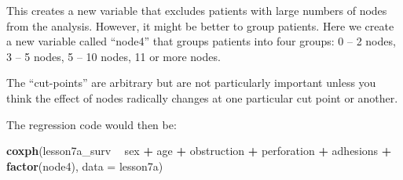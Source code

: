 \documentclass[]{book}
\newenvironment{Shaded}{\begin{snugshade}}{\end{snugshade}}
\newcommand{\DataTypeTok}[1]{\textcolor[rgb]{0.13,0.29,0.53}{#1}}
\newcommand{\DecValTok}[1]{\textcolor[rgb]{0.00,0.00,0.81}{#1}}
\newcommand{\KeywordTok}[1]{\textcolor[rgb]{0.13,0.29,0.53}{\textbf{#1}}}
\newcommand{\NormalTok}[1]{#1}
\newcommand{\OperatorTok}[1]{\textcolor[rgb]{0.81,0.36,0.00}{\textbf{#1}}}
\newcommand{\StringTok}[1]{\textcolor[rgb]{0.31,0.60,0.02}{#1}}
\begin{document}
This creates a new variable that excludes patients with large numbers of nodes from the analysis. However, it might be better to group patients. Here we create a new variable called ``node4'' that groups patients into four groups: 0 -- 2 nodes, 3 -- 5 nodes, 5 -- 10 nodes, 11 or more nodes.

\begin{Shaded}
\end{Shaded}

The ``cut-points'' are arbitrary but are not particularly important unless you think the effect of nodes radically changes at one particular cut point or another.

The regression code would then be:

\begin{Shaded}
\begin{Highlighting}[]
\KeywordTok{coxph}\NormalTok{(lesson7a_surv }\OperatorTok{~}\StringTok{ }\NormalTok{sex }\OperatorTok{+}\StringTok{ }\NormalTok{age }\OperatorTok{+}\StringTok{ }\NormalTok{obstruction }\OperatorTok{+}\StringTok{ }\NormalTok{perforation }\OperatorTok{+}\StringTok{ }\NormalTok{adhesions }\OperatorTok{+}\StringTok{ }\KeywordTok{factor}\NormalTok{(node4), }\DataTypeTok{data =}\NormalTok{ lesson7a)}
\end{Highlighting}
\end{Shaded}
\end{document}
